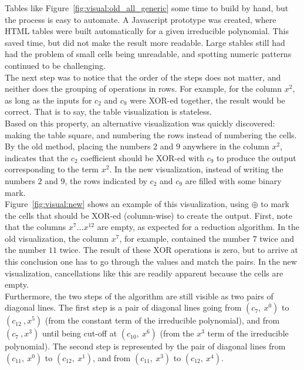 Tables like Figure~\ref{fig:visual:old_all_generic} some time to build by hand, but the process is easy to automate. A Javascript prototype was created, where HTML tables were built automatically for a given irreducible polynomial. This saved time, but did not make the result more readable. Large stables still had had the problem of small cells being unreadable, and spotting numeric patterns continued to be challenging. \\

The next step was to notice that the order of the steps does not matter, and neither does the grouping of operations in rows. For example, for the column $x^2$, as long as the inputs for $c_2$ and $c_9$ were XOR-ed together, the result would be correct. That is to say, the table visualization is stateless. \\

Based on this property, an alternative visualization was quickly discovered: making the table square, and numbering the rows instead of numbering the cells. By the old method, placing the numbers $2$ and $9$ anywhere in the column $x^2$, indicates that the $c_2$ coefficient should be XOR-ed with $c_9$ to produce the output corresponding to the term $x^2$. In the new visualization, instead of writing the numbers $2$ and $9$, the rows indicated by $c_2$ and $c_9$ are filled with some binary mark. \\

Figure~\ref{fig:visual:new} shows an example of this visualization, using $\oplus$ to mark the cells that should be XOR-ed (column-wise) to create the output. First, note that the columns $x^7 \ldots x^{12}$ are empty, as expected for a reduction algorithm. In the old visualization, the column $x^7$, for example, contained the number $7$ twice and the number $11$ twice. The result of these XOR operations is zero, but to arrive at this conclusion one has to go through the values and match the pairs. In the new visualization, cancellations like this are readily apparent because the cells are empty. \\

Furthermore, the two steps of the algorithm are still visible as two pairs of diagonal lines. The first step is a pair of diagonal lines going from $(c_7,~x^0)$ to $(c_{12}~,x^5)$ (from the constant term of the irreducible polynomial), and from $(c_7~,x^3)$ until being cut-off at $(c_{10},~x^6)$ (from the $x^3$ term of the irreducible polynomial). The second step is represented by the pair of diagonal lines from $(c_{11},~x^0)$ to $(c_{12},~x^1)$, and from $(c_{11},~x^3)$ to $(c_{12},~x^4)$. \\

